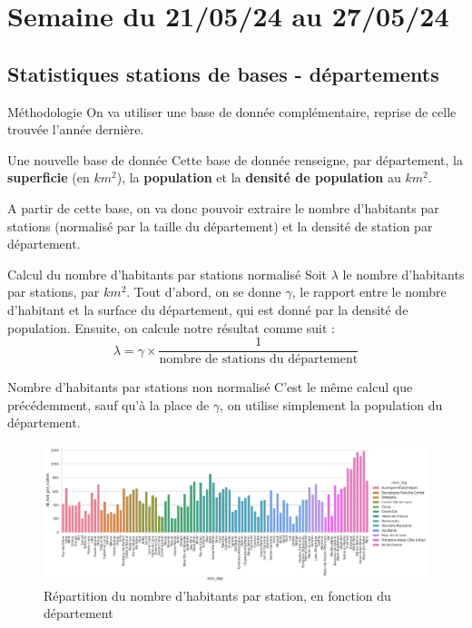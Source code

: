 \smallframetitle

\section{Semaine du 21/05/24 au 27/05/24}
\insertsectionframe

\subsection{Statistiques stations de bases - départements}
\insertsubsectionframe

\begin{frame}{Méthodologie}
    On va utiliser une base de donnée complémentaire, reprise de celle trouvée l'année dernière.

    \begin{block}{Une nouvelle base de donnée\footnotemark[1]}
        Cette base de donnée renseigne, par département, la \textbf{superficie} (en $\unit{km^2}$), la \textbf{population} et la \textbf{densité de population} au $\unit{km^2}$.
    \end{block}
    
    A partir de cette base, on va donc pouvoir extraire le nombre d'habitants par stations (normalisé par la taille du département) et la densité de station par département.

    \begin{block}{Calcul du nombre d'habitants par stations normalisé}
        Soit $\lambda$ le nombre d'habitants par stations, par $\unit{km^2}$. Tout d'abord, on se donne $\gamma$, le rapport entre le nombre d'habitant et la surface du département, qui est donné par la densité de population.
        Ensuite, on calcule notre résultat comme suit :$$\lambda = \gamma\times\frac{1}{\text{nombre de stations du département}}$$
    \end{block}

\end{frame}

\begin{frame}{Nombre d'habitants par stations non normalisé}
    C'est le même calcul que précédemment, sauf qu'à la place de $\gamma$, on utilise simplement la population du département.
    \begin{figure}
        \includegraphics[width=0.9\paperwidth]{images/barplots/nb_hab_par_station_par_dep.png}
        \caption{\label{fig:nb_hap_par_stat_par_dep}Répartition du nombre d'habitants par station, en fonction du département}
    \end{figure}
\end{frame}

